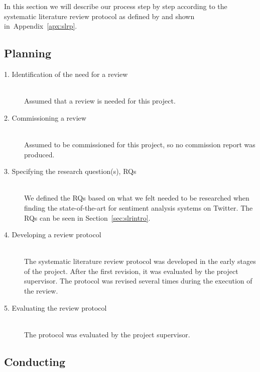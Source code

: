 In this section we will describe our process step by step according to the systematic literature review protocol as defined by and shown in~Appendix~\ref{apx:slrp}.

\subsection{Planning}

\begin{description}

	\item[1. Identification of the need for a review] \hfill \\
		Assumed that a review is needed for this project. 
		
	\item[2. Commissioning a review] \hfill \\
		Assumed to be commissioned for this project, so no commission report was produced. 

	\item[3. Specifying the research question(s), RQs] \hfill \\
		We defined the RQs based on what we felt needed to be researched when finding the state-of-the-art for sentiment analysis systems on Twitter. The RQs can be seen in Section~\ref{sec:slrintro}. 

	\item[4. Developing a review protocol] \hfill \\
		The systematic literature review protocol  was developed in the early stages of the project. After the first revision, it was evaluated by the project supervisor. The protocol was revised several times during the execution of the review.
	

	\item[5. Evaluating the review protocol] \hfill \\
		The protocol was evaluated by the project supervisor. 

\end{description}


\subsection{Conducting}

